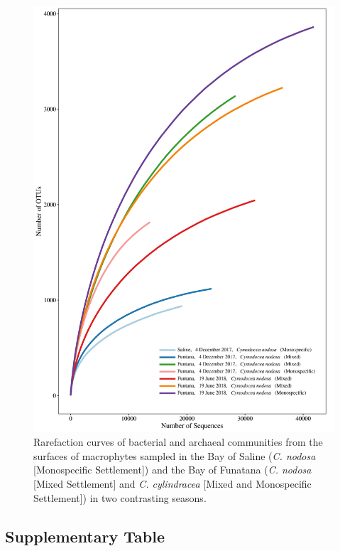 \documentclass[12pt,]{article}
\begin{document}
\begin{figure}[H]

{\centering \includegraphics[width=0.8\linewidth]{../results/figures/rarefaction} 

}

\caption{Rarefaction curves of bacterial and archaeal communities from the surfaces of macrophytes sampled in the Bay of Saline (\textit{C. nodosa} [Monospecific Settlement]) and the Bay of Funatana (\textit{C. nodosa} [Mixed Settlement] and \textit{C. cylindracea} [Mixed and Monospecific Settlement]) in two contrasting seasons.\label{rarefaction}}\label{fig:unnamed-chunk-1}
\end{figure}

\newpage

\hypertarget{supplementary-table}{%
\subsection{Supplementary Table}\label{supplementary-table}}

\begingroup\fontsize{9}{11}\selectfont
\end{document}
